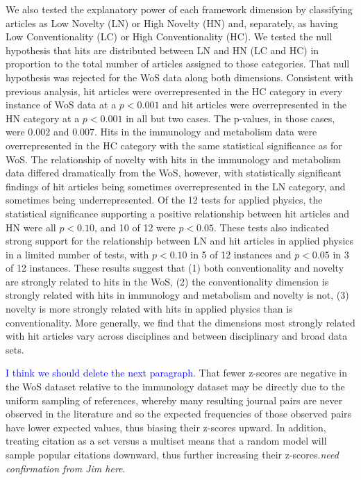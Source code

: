 \documentclass[NETN]{stjour}
\begin{document}
We also tested the explanatory power of each framework dimension by classifying articles as Low Novelty (LN) or High Novelty (HN) and, separately, as having Low Conventionality (LC) or High Conventionality (HC).  We tested the null hypothesis that hits are distributed between LN and HN (LC and HC) in proportion to the total number of articles assigned to those categories.  That null hypothesis was rejected for the WoS data along both dimensions. Consistent with previous analysis, hit articles were overrepresented in the HC category in every instance of WoS data at a $p<0.001$ and hit articles were overrepresented in the HN category at a $p<0.001$ in all but two cases.  
The p-values, in those cases, were $0.002$ and $0.007$.  
Hits in the immunology and metabolism data were overrepresented in the HC category with the same statistical significance as for WoS. The relationship of novelty with hits in the immunology and metabolism data differed dramatically from the WoS, however, with statistically significant findings of hit articles being sometimes overrepresented in the LN category, and sometimes being underrepresented.  Of the 12 tests for applied physics, the statistical significance supporting a positive relationship between hit articles and HN were all $p<0.10$, and 10 of 12 were $p<0.05$.  These tests also indicated strong support for the relationship between LN and hit articles in applied physics in a limited number of tests, with $p<0.10$ in 5 of 12 instances and $p < 0.05$ in 3 of 12 instances. These results suggest that (1) both conventionality and novelty are strongly related to hits in the WoS, (2) the conventionality dimension is strongly related with hits in immunology and metabolism and novelty is not, (3) novelty is more strongly related with hits in applied physics than is conventionality. More generally, we find that the dimensions most strongly related with hit articles vary across disciplines and between disciplinary and broad data sets. 

\textcolor{blue}{I think we should delete the next paragraph.}
That fewer z-scores are negative in the WoS dataset relative to the immunology dataset may be directly due to the uniform sampling of references, whereby many resulting journal pairs are never observed in the literature and so the expected frequencies of those observed pairs have lower expected values, thus biasing their z-scores upward. In addition, treating citation as a set versus a multiset means that a random model will sample popular citations downward, thus further increasing their z-scores.\emph{need confirmation from Jim here}.
\end{document}
